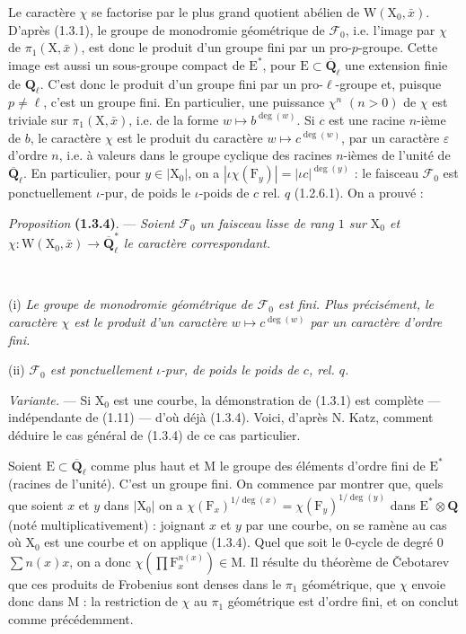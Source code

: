 \documentclass[11pt,leqno]{article}
\newcommand{\Page}[1]{\ifvmode\noindent\else\unskip\ \fi{\footnotesize\textcolor{gray}{[p.\,#1]}}\ \ignorespaces}
\begin{document}
Le caractère \(\chi\) se factorise par le plus grand quotient abélien de \(\mathrm{W}(\mathrm{X}_0,\bar{x})\). D’après (1.3.1), le groupe de monodromie géométrique de \(\mathscr{F}_0\), i.e. l’image par \(\chi\) de \(\pi_1(\mathrm{X},\bar{x})\), est donc le produit d’un groupe fini par un pro-\(p\)-groupe. Cette image est aussi un sous-groupe compact de \(\mathrm{E}^*\), pour \(\mathrm{E}\subset\overline{\mathbf{Q}}_\ell\) une extension finie de \(\mathbf{Q}_\ell\). C’est donc le produit d’un groupe fini par un pro-\(\ell\)-groupe et, puisque \(p\ne\ell\), c’est un groupe fini. En particulier, une puissance \(\chi^n\) \((n>0)\) de \(\chi\) est triviale sur \(\pi_1(\mathrm{X},\bar{x})\), i.e. de la forme \(w\mapsto b^{\deg(w)}\).
Si \(c\) est une racine \(n\)-ième de \(b\), le caractère \(\chi\) est le produit du caractère \(w\mapsto c^{\deg(w)}\), par un caractère \(\varepsilon\) d’ordre \(n\), i.e. à valeurs dans le groupe cyclique des racines \(n\)-ièmes de l’unité de \(\overline{\mathbf{Q}}_\ell\). En particulier, pour \(y\in|\mathrm{X}_0|\), on a \(|\iota\chi(\mathrm{F}_y)|=|\iota c|^{\deg(y)}\) : le faisceau \(\mathscr{F}_0\) est ponctuellement \(\iota\)-pur, de poids le \(\iota\)-poids de \(c\) rel. \(q\) (1.2.6.1). On a prouvé :

\textit{Proposition} \textbf{(1.3.4)}. — \textit{Soient \(\mathscr{F}_0\) un faisceau lisse de rang \(1\) sur \(\mathrm{X}_0\) et \(\chi:\mathrm{W}(\mathrm{X}_0,\bar{x})\to\overline{\mathbf{Q}}_\ell^*\) le caractère correspondant.}

\Page{158}

(i) \textit{Le groupe de monodromie géométrique de \(\mathscr{F}_0\) est fini. Plus précisément, le caractère \(\chi\) est le produit d’un caractère \(w\mapsto c^{\deg(w)}\) par un caractère d’ordre fini.}

(ii) \textit{\(\mathscr{F}_0\) est ponctuellement \(\iota\)-pur, de poids le poids de \(c\), rel. \(q\).}

\textit{Variante.} — Si \(\mathrm{X}_0\) est une courbe, la démonstration de (1.3.1) est complète — indépendante de (1.11) — d’où déjà (1.3.4). Voici, d’après N. Katz, comment déduire le cas général de (1.3.4) de ce cas particulier.

Soient \(\mathrm{E}\subset\overline{\mathbf{Q}}_\ell\) comme plus haut et \(\mathrm{M}\) le groupe des éléments d’ordre fini de \(\mathrm{E}^*\) (racines de l’unité). C’est un groupe fini. On commence par montrer que, quels que soient \(x\) et \(y\) dans \(|\mathrm{X}_0|\) on a \(\chi(\mathrm{F}_x)^{1/\deg(x)}=\chi(\mathrm{F}_y)^{1/\deg(y)}\) dans \(\mathrm{E}^*\otimes\mathbf{Q}\) (noté multiplicativement) : joignant \(x\) et \(y\) par une courbe, on se ramène au cas où \(\mathrm{X}_0\) est une courbe et on applique (1.3.4). Quel que soit le \(0\)-cycle de degré \(0\) \(\sum n(x)x\), on a donc \(\chi(\prod\mathrm{F}_x^{n(x)})\in\mathrm{M}\). Il résulte du théorème de Čebotarev que ces produits de Frobenius sont denses dans le \(\pi_1\) géométrique, que \(\chi\) envoie donc dans \(\mathrm{M}\) : la restriction de \(\chi\) au \(\pi_1\) géométrique est d’ordre fini, et on conclut comme précédemment.
\end{document}
